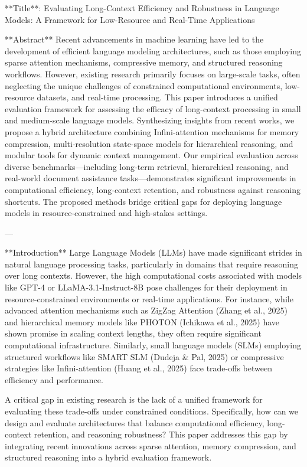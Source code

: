 **Title**: Evaluating Long-Context Efficiency and Robustness in Language Models: A Framework for Low-Resource and Real-Time Applications  

**Abstract**  
Recent advancements in machine learning have led to the development of efficient language modeling architectures, such as those employing sparse attention mechanisms, compressive memory, and structured reasoning workflows. However, existing research primarily focuses on large-scale tasks, often neglecting the unique challenges of constrained computational environments, low-resource datasets, and real-time processing. This paper introduces a unified evaluation framework for assessing the efficacy of long-context processing in small and medium-scale language models. Synthesizing insights from recent works, we propose a hybrid architecture combining Infini-attention mechanisms for memory compression, multi-resolution state-space models for hierarchical reasoning, and modular tools for dynamic context management. Our empirical evaluation across diverse benchmarks—including long-term retrieval, hierarchical reasoning, and real-world document assistance tasks—demonstrates significant improvements in computational efficiency, long-context retention, and robustness against reasoning shortcuts. The proposed methods bridge critical gaps for deploying language models in resource-constrained and high-stakes settings.  

---

**Introduction**  
Large Language Models (LLMs) have made significant strides in natural language processing tasks, particularly in domains that require reasoning over long contexts. However, the high computational costs associated with models like GPT-4 or LLaMA-3.1-Instruct-8B pose challenges for their deployment in resource-constrained environments or real-time applications. For instance, while advanced attention mechanisms such as ZigZag Attention (Zhang et al., 2025) and hierarchical memory models like PHOTON (Ichikawa et al., 2025) have shown promise in scaling context lengths, they often require significant computational infrastructure. Similarly, small language models (SLMs) employing structured workflows like SMART SLM (Dudeja & Pal, 2025) or compressive strategies like Infini-attention (Huang et al., 2025) face trade-offs between efficiency and performance.  

A critical gap in existing research is the lack of a unified framework for evaluating these trade-offs under constrained conditions. Specifically, how can we design and evaluate architectures that balance computational efficiency, long-context retention, and reasoning robustness? This paper addresses this gap by integrating recent innovations across sparse attention, memory compression, and structured reasoning into a hybrid evaluation framework.  

